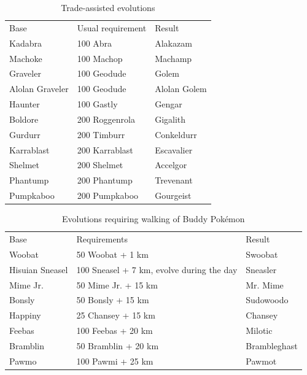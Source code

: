 \begin{table}
\footnotesize
\centering
\begin{tabular}{lll}
  Base & Usual requirement & Result \\
\Midrule
Kadabra & 100 Abra & Alakazam\\
Machoke & 100 Machop & Machamp\\
  Graveler & 100 Geodude & Golem\\
  Alolan Graveler & 100 Geodude & Alolan Golem\\
  Haunter & 100 Gastly & Gengar\\
  Boldore & 200 Roggenrola & Gigalith\\
  Gurdurr & 200 Timburr & Conkeldurr\\
  Karrablast & 200 Karrablast & Escavalier\\
  Shelmet & 200 Shelmet & Accelgor\\
  Phantump & 200 Phantump & Trevenant\\
  Pumpkaboo & 200 Pumpkaboo & Gourgeist\\
\end{tabular}
  \caption{Trade-assisted evolutions\label{table:tradeevolution}}
\end{table}
\begin{table}
\footnotesize
\centering
\begin{tabular}{lll}
  Base & Requirements & Result \\
\Midrule
  Woobat & 50 Woobat + 1 km & Swoobat\\
  Hisuian Sneasel & 100 Sneasel + 7 km, evolve during the day & Sneasler\\
  Mime Jr. & 50 Mime Jr. + 15 km & Mr. Mime\\
  Bonsly & 50 Bonsly + 15 km & Sudowoodo\\
  Happiny & 25 Chansey + 15 km & Chansey\\
  Feebas & 100 Feebas + 20 km & Milotic\\
  Bramblin & 50 Bramblin + 20 km & Brambleghast \\
  Pawmo & 100 Pawmi + 25 km & Pawmot\\
\end{tabular}
  \caption{Evolutions requiring walking of Buddy Pokémon\label{table:walkevolutions}}
\end{table}

